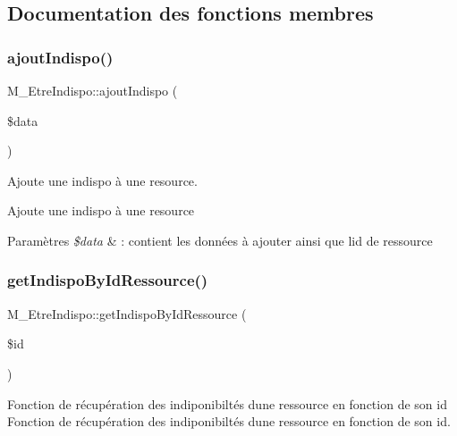 \subsection{Documentation des fonctions membres}
\mbox{\label{class_m___etre_indispo_a07544241a34c628237f7cb76f9fe71a4}} 
\subsubsection{\texorpdfstring{ajout\+Indispo()}{ajoutIndispo()}}
{\footnotesize\ttfamily M\+\_\+\+Etre\+Indispo\+::ajout\+Indispo (\begin{DoxyParamCaption}\item[{}]{\$data }\end{DoxyParamCaption})}



Ajoute une indispo à une resource. 

Ajoute une indispo à une resource 
\begin{DoxyParams}{Paramètres}
{\em \$data} & \+: contient les données à ajouter ainsi que l\textquotesingle{}id de ressource \\
\hline
\end{DoxyParams}
\mbox{\label{class_m___etre_indispo_aafdc093cd06c61f5453a109d1943581f}} 
\subsubsection{\texorpdfstring{get\+Indispo\+By\+Id\+Ressource()}{getIndispoByIdRessource()}}
{\footnotesize\ttfamily M\+\_\+\+Etre\+Indispo\+::get\+Indispo\+By\+Id\+Ressource (\begin{DoxyParamCaption}\item[{}]{\$id }\end{DoxyParamCaption})}



Fonction de récupération des indiponibiltés d\textquotesingle{}une ressource en fonction de son id  Fonction de récupération des indiponibiltés d\textquotesingle{}une ressource en fonction de son id. 


